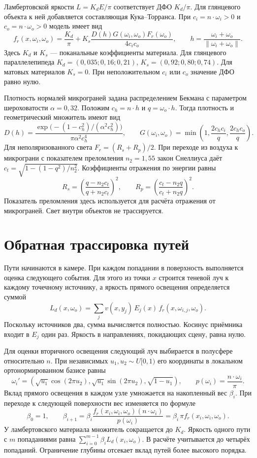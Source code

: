 Ламбертовской яркости \(L=K_dE/\pi\) соответствует ДФО \(K_d/\pi\).
Для глянцевого объекта к ней добавляется составляющая Кука--Торранса.
При \(c_i=n\cdot\omega_i>0\) и \(c_o=n\cdot\omega_o>0\) модель имеет вид
\[
 f_r(x,\omega_i,\omega_o)=\frac{K_d}{\pi}
  +K_s\frac{D(h)G(\omega_i,\omega_o)F_r(\omega_o)}{4c_i c_o},
 \qquad h=\frac{\omega_i+\omega_o}{\lVert\omega_i+\omega_o\rVert}.
\]
Здесь \(K_d\) и \(K_s\) --- поканальные коэффициенты материала. Для
глянцевого параллелепипеда \(K_d=(0{,}035;0{,}16;0{,}21)\),
\(K_s=(0{,}92;0{,}80;0{,}74)\). Для матовых материалов \(K_s=0\).
При неположительном \(c_i\) или \(c_o\) значение ДФО равно нулю.

Плотность нормалей микрограней задана распределением Бекмана с параметром
шероховатости \(\alpha=0{,}32\). Положим \(c_h=n\cdot h\) и \(q=\omega_o\cdot h\).
Тогда плотность и геометрический множитель имеют вид
\[
 D(h)=\frac{\exp\!\bigl(-(1-c_h^2)/(\alpha^2c_h^2)\bigr)}
                 {\pi\alpha^2c_h^4},\qquad
 G(\omega_i,\omega_o)=\min\left(1,\frac{2c_hc_i}{q},\frac{2c_hc_o}{q}\right).
\]
Для неполяризованного света \(F_r=(R_s+R_p)/2\). При переходе из воздуха к
микрограни с показателем преломления \(n_2=1{,}55\) закон Снеллиуса даёт
\(c_t=\sqrt{1-(1-q^2)/n_2^2}\). Коэффициенты отражения по энергии равны
\[
 R_s=\left(\frac{q-n_2c_t}{q+n_2c_t}\right)^2,\qquad
 R_p=\left(\frac{c_t-n_2q}{c_t+n_2q}\right)^2.
\]
Показатель преломления здесь используется для расчёта отражения от
микрограней. Свет внутри объектов не трассируется.

\clearpage
\section{Обратная трассировка путей}

Пути начинаются в камере. При каждом попадании в поверхность выполняется
оценка следующего события. Для этого из точки \(x\) строится теневой луч к
каждому точечному источнику, а яркость прямого освещения определяется суммой
\[
 L_d(x,\omega_o)=\sum_j v(x,y_j)\,E_j(x)\,f_r(x,\omega_{i,j},\omega_o).
\]
Поскольку источников два, сумма вычисляется полностью. Косинус приёмника
входит в \(E_j\) один раз. Яркость в направлениях, покидающих сцену, равна
нулю.

Для оценки вторичного освещения следующий луч выбирается в полусфере
относительно \(n\). При независимых \(u_1,u_2\sim U[0,1)\) его координаты в
локальном ортонормированном базисе равны
\[
 \omega_i'=\left(\sqrt{u_1}\cos(2\pi u_2),
                 \sqrt{u_1}\sin(2\pi u_2),\sqrt{1-u_1}\right),\qquad
 p(\omega_i)=\frac{n\cdot\omega_i}{\pi}.
\]
Вклад прямого освещения в каждом узле умножается на накопленный вес
\(\beta_i\). При переходе к следующей поверхности вес изменяется по формуле
\[
 \beta_0=1,\qquad
 \beta_{i+1}
 =\beta_i\frac{f_r(x_i,\omega_i,\omega_o)(n\cdot\omega_i)}{p(\omega_i)}
 =\beta_i\,\pi f_r(x_i,\omega_i,\omega_o).
\]
У ламбертовского материала множитель сокращается до \(K_d\).
Яркость одного пути с \(m\) попаданиями равна
\(\sum_{i=0}^{m-1}\beta_i L_d(x_i,\omega_o)\). В расчёте учитывается до
четырёх попаданий. Ограничение глубины отсекает вклад путей более высокого
порядка.

